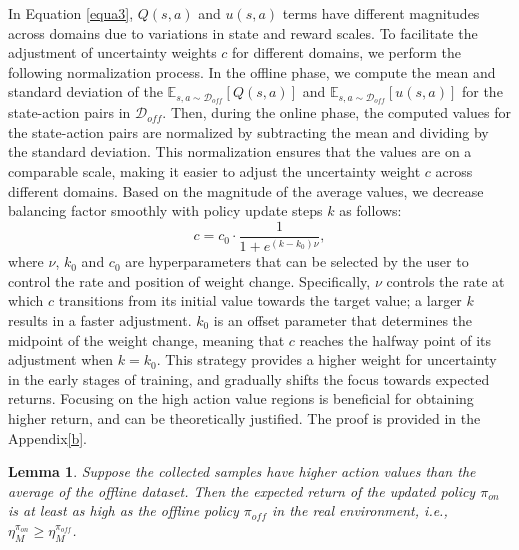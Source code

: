 \documentclass[letterpaper]{article} %
\newtheorem{lemma}{Lemma}
\begin{document}
In Equation \ref{equa3}, $Q(s,a)$ and $u(s, a)$ terms have different magnitudes across domains due to variations in state and reward scales. To facilitate the adjustment of uncertainty weights \( c \) for different domains, we perform the following normalization process. In the offline phase, we compute the mean and standard deviation of the $\mathbb{E}_{s, a\sim \mathcal{D}_{off}}[Q(s, a)]$ and $\mathbb{E}_{s, a\sim \mathcal{D}_{off}}[u(s, a)]$ for the state-action pairs in \( \mathcal{D}_{off} \). Then, during the online phase, the  computed values for the state-action pairs are normalized by subtracting the mean and dividing by the standard deviation. This normalization ensures that the values are on a comparable scale, making it easier to adjust the uncertainty weight \( c \) across different domains. Based on the magnitude of the average values, we decrease balancing factor smoothly with policy update steps \( k \) as follows:
\begin{equation}
\label{eqa4}
    c = c_0 \cdot \frac{1}{1 + e^{(k - k_0)\nu}},
\end{equation}
where $\nu$, $k_0$ and $c_0$ are hyperparameters that can be selected by the user to control the rate and position of weight change. Specifically, $\nu$ controls the rate at which $c$ transitions from its initial value towards the target value; a larger $k$ results in a faster adjustment. $k_0$ is an offset parameter that determines the midpoint of the weight change, meaning that $c$ reaches the halfway point of its adjustment when $k=k_0$. This strategy provides a higher weight for uncertainty in the early stages of training, and gradually shifts the focus towards expected returns. Focusing on the high action value regions is beneficial for obtaining higher return, and can be theoretically justified. The proof is provided in the Appendix\ref{b}.

\begin{lemma}
Suppose the collected samples have higher action values than the average of the offline dataset. Then the expected return of the updated policy $\pi_{on}$ is at least as high as the offline policy $\pi_{off}$ in the real environment, i.e., $\eta_M^{\pi_{on}} \geq \eta_M^{\pi_{off}}$.
\end{lemma}
\end{document}
